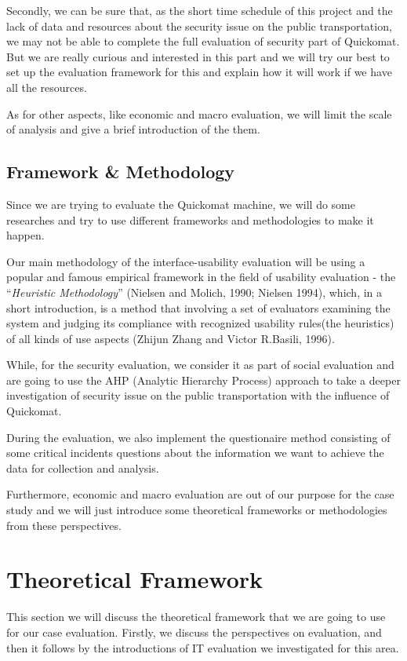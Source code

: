 \documentclass[twocolumn]{article}
\begin{document}
Secondly, we can be sure that, as the short time schedule of this project and the lack of data and resources about the security issue on the public transportation, we may not be able to complete the full evaluation of security part of Quickomat. But we are really curious and interested in this part and we will try our best to set up the evaluation framework for this and explain how it will work if we have all the resources. 

As for other aspects, like economic and  macro evaluation, we will limit the scale of analysis and give a brief introduction of the them.

\subsection{Framework \& Methodology}
Since we are trying to evaluate the Quickomat machine, we will do some researches and try to use different frameworks and methodologies to make it happen.

Our main methodology of the interface-usability evaluation will be using a popular and famous empirical framework in the field of usability evaluation - the “\emph{Heuristic Methodology}” (Nielsen and Molich, 1990; Nielsen 1994), which, in a short introduction, is a method that involving a set of evaluators examining the system and judging its compliance with recognized usability rules(the heuristics) of all kinds of use aspects (Zhijun Zhang and Victor R.Basili, 1996). 

While, for the security evaluation, we consider it as part of social evaluation and are going to use the AHP (Analytic Hierarchy Process) approach to take a deeper investigation of security issue on the public transportation with the influence of Quickomat. 

During the evaluation, we also implement the questionaire method consisting of some critical incidents questions about the information we want to achieve the data for collection and analysis.

Furthermore, economic and macro evaluation are out of our purpose for the case study and we will just introduce some theoretical frameworks or methodologies from these perspectives.

\section{Theoretical Framework}
This section we will discuss the theoretical framework that we are going to use for our case evaluation. Firstly, we discuss the perspectives on evaluation, and then it follows by the introductions of IT evaluation we investigated for this area.
\end{document}
